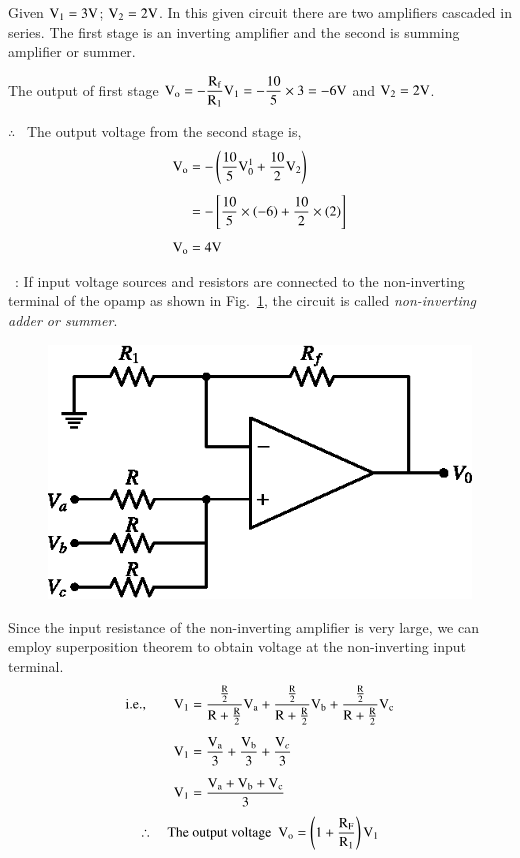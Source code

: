 \begin{solution}
Given $\textrm{V}_{1}=3\textrm{V}$; $\textrm{V}_{2}=2\textrm{V}$. In this given circuit there are two amplifiers cascaded in series. The first stage is an inverting amplifier and the second is summing amplifier or summer.

\smallskip
The output of first stage $\textrm{V}_{\textrm{o}}=-\dfrac{\textrm{R}_{\textrm{f}}}{\textrm{R}_{1}}\textrm{V}_{1}=-\dfrac{10}{5}\times 3=-6\textrm{V}$ and $\textrm{V}_{2}=2\textrm{V}$.

\smallskip
$\therefore$~ The output voltage from the second stage is,
\begin{align*}
\textrm{V}_{\textrm{o}} &= -\left(\dfrac{10}{5}\textrm{V}^{1}_{0}+\dfrac{10}{2}\textrm{V}_{2}\right)\\[4pt]
&=-\left[\frac{10}{5}\times (-6)+\dfrac{10}{2}\times (2)\right]\\[4pt]
\textrm{V}_{\textrm{o}} &= 4\textrm{V}
\end{align*}
\end{solution}

~: If input voltage sources and resistors are connected to the non-inverting terminal of the opamp as shown in Fig.~\ref{fig4.11}, the circuit is called {\em non-inverting adder or summer}.
\begin{figure}[H]
\centering
\includegraphics{chap4/fig4.11a.eps}
\caption{}\label{fig4.11}
\end{figure}

Since the input resistance of the non-inverting amplifier is very large, we can employ superposition theorem to obtain voltage at the non-inverting input terminal. 
\begin{align}
\text{i.e.,}\qquad \textrm{V}_{1} &= \frac{\frac{\textrm{R}}{2}}{\textrm{R}+\frac{\textrm{R}}{2}}\textrm{V}_{\textrm{a}}+\frac{\frac{\textrm{R}}{2}}{\textrm{R}+\frac{\textrm{R}}{2}}\textrm{V}_{\textrm{b}}+\frac{\frac{\textrm{R}}{2}}{\textrm{R}+\frac{\textrm{R}}{2}}\textrm{V}_{\textrm{c}}\notag\\[5pt]
\textrm{V}_{1} &= \frac{\textrm{V}_{\textrm{a}}}{3}+\frac{\textrm{V}_{\textrm{b}}}{3}+\frac{\textrm{V}_{c}}{3}\notag\\[5pt]
\textrm{V}_{1} &= \frac{\textrm{V}_{\textrm{a}}+\textrm{V}_{\textrm{b}}+\textrm{V}_{\textrm{c}}}{3}\label{eq4.34}
\end{align}
\begin{equation}
\therefore\quad \text{The output voltage~ } \textrm{V}_{\textrm{o}}=\left(1+\frac{\textrm{R}_{\textrm{F}}}{\textrm{R}_{1}}\right)\textrm{V}_{1}\label{eq4.35}
\end{equation}

